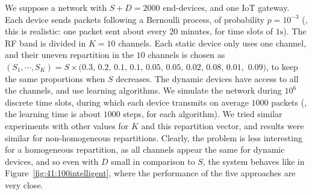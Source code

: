 We suppose a network with $S + D = 2000$ end-devices, and one IoT gateway.
Each device sends packets following a Bernoulli process, of probability $p = 10^{-3}$ (\eg, this is realistic: one packet sent about every $20$ minutes, for time slots of $1\mathrm{s}$).
The RF band is divided in $K = 10$ channels.
Each static device only uses one channel, and their uneven repartition in the $10$ channels is chosen as $(S_1,\cdots, S_{K}) = S \times (0.3, \, 0.2, \, 0.1, \, 0.1, \, 0.05, \, 0.05, \, 0.02, \, 0.08, \, 0.01,$ $0.09)$, to keep the same proportions when $S$ decreases. The dynamic devices have access to all the channels, and use learning algorithms.
%
We simulate the network during $10^6$ discrete time slots, during which each device transmits on average $1000$ packets (\ie, the learning time is about $1000$ steps, for each algorithm).
We tried similar experiments with other values for $K$ and this repartition vector, and results were similar for non-homogeneous repartitions. Clearly, the problem is less interesting for a homogeneous repartition, as all channels appear the same for dynamic devices, and so even with $D$ small in comparison to $S$, the system behaves like in Figure~\ref{fig:41:100intelligent}, where the performance of the five approaches are very close.

